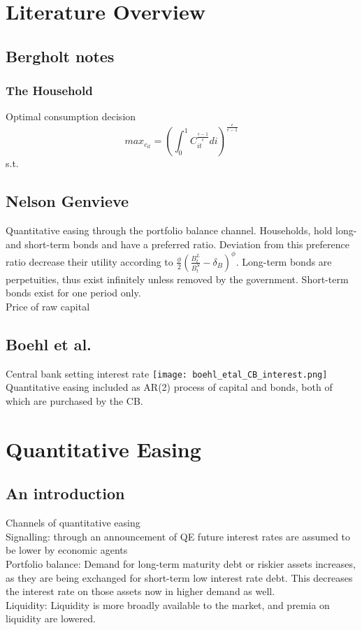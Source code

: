 \documentclass[11pt,a4paper,english]{article} %
\begin{document}
	
	\section{Literature Overview}
		
	\subsection{Bergholt notes}
	\subsubsection{The Household}
	Optimal consumption decision \\
	\[
	max_{c_{it}} = (
	\int_{0}^{1} C_{it}^{\frac{\epsilon-1}{\epsilon}} di
	)^{\frac{\epsilon}{\epsilon-1}}
	\]
	s.t.
	
	\subsection{Nelson Genvieve}
	Quantitative easing through the portfolio balance channel. Households, hold long- and short-term bonds and have a preferred ratio. Deviation from this preference ratio decrease their utility according to $\frac{\phi}{2}(\frac{B_t^L}{B_t^S} - \delta_B)^{\phi}$. Long-term bonds are perpetuities, thus exist infinitely unless removed by the government. Short-term bonds exist for one period only.\\
	
	Price of raw capital\\
	
	\subsection{Boehl et al.}
	Central bank setting interest rate
	\texttt{[image: boehl\_etal\_CB\_interest.png]} \\
	
	Quantitative easing included as AR(2) process of capital and bonds, both of which are purchased by the CB.
	
	
	\section{Quantitative Easing}
	
	\subsection{An introduction}
	Channels of quantitative easing\\
	Signalling: through an announcement of QE future interest rates are assumed to be lower by economic agents\\
	Portfolio balance: Demand for long-term maturity debt or riskier assets increases, as they are being exchanged for short-term low interest rate debt. This decreases the interest rate on those assets now in higher demand as well.\\
	Liquidity: Liquidity is more broadly available to the market, and premia on liquidity are lowered. \\
	
\end{document}

